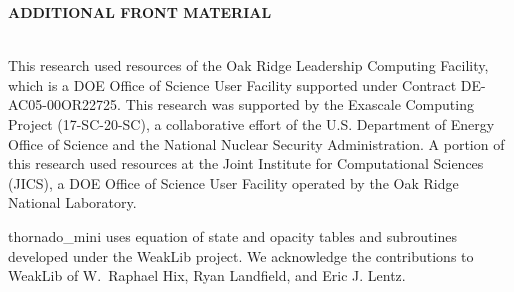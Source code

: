 \documentclass[11pt,letterpaper,twoside,english,final]{article}
\begin{document}
\newpage

\clearemptydoublepage
{}
{}
\begin{center}
{\bf{ADDITIONAL FRONT MATERIAL}}
\end{center}

%

\\

This research used resources of the Oak Ridge Leadership Computing Facility, which is a DOE Office of Science User Facility supported under Contract DE-AC05-00OR22725.  
This research was supported by the Exascale Computing Project (17-SC-20-SC), a collaborative effort of the U.S. Department of Energy Office of Science and the National Nuclear Security Administration.  
A portion of this research used resources at the Joint Institute for Computational Sciences (JICS), a DOE Office of Science User Facility operated by the Oak Ridge National Laboratory.

thornado{\_}mini uses equation of state and opacity tables and subroutines developed under the WeakLib project.  
We acknowledge the contributions to WeakLib of W.~Raphael Hix, Ryan Landfield, and Eric J. Lentz.  

%
%
%
%
%
%
\end{document}
